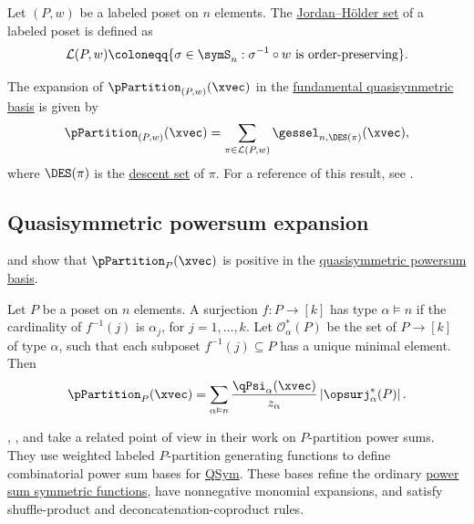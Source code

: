 Let $(P,w)$ be a labeled poset on $n$ elements. 
The \hyperref[jordanHolderSet]{Jordan--Hölder set} of a labeled poset is
defined as
\begin{equation*}
\mathcal{L}(P,w) \coloneqq
\{\sigma\in\symS_n:\sigma^{-1}\circ w\text{ is order-preserving}\}.
\end{equation*}

The expansion of $\pPartition_{(P,w)}(\xvec)$ in the
\hyperref[gessel]{fundamental quasisymmetric basis} is given by
\[
\pPartition_{(P,w)}(\xvec)
= \sum_{\pi \in \mathcal{L}(P,w)} \gessel_{n,\DES(\pi)}(\xvec),
\]
where $\DES(\pi)$ is the \hyperref[descentSet]{descent set} of $\pi$.
For a reference of this result, see \cite[Eq. (7.95)]{StanleyEC2}.



\subsection[pPartitionPsiExp]{Quasisymmetric powersum expansion}


 and 
\cite{AlexanderssonSulzgruber2019}
show that $\pPartition_P(\xvec)$ is positive
in the \hyperref[qPsi]{quasisymmetric powersum basis}. 

\begin{theorem}

Let $P$ be a poset on $n$ elements.
A surjection $f:P \to [k]$ has type $\alpha \vDash n$
if the cardinality of $f^{-1}(j)$ is $\alpha_j$, for $j=1,\dotsc,k$.
Let $\mathcal{O}_{\alpha}^{\ast}(P)$ be the set of 
\label{orderPreservingSurjection}
$P \to [k]$
of type $\alpha$, such that each subposet $f^{-1}(j) \subseteq P$
has a unique minimal element.
Then
\[
\pPartition_P(\xvec)
=
\sum_{\alpha\vDash n}
\frac{\qPsi_{\alpha}(\xvec)}{z_{\alpha}}\left| \opsurj_{\alpha}^{\ast}(P) \right|.
\]
\end{theorem}

, , and
 \cite{AliniaeifardWangWilligenburg2023}
take a related point of view in their work on $P$-partition power sums.  They
use weighted labeled $P$-partition generating functions to define combinatorial
power sum bases for \hyperref[quasiSymmetricFunctions]{QSym}.  These bases
refine the ordinary \hyperref[powerSum]{power sum symmetric functions}, have
nonnegative monomial expansions, and satisfy shuffle-product and
deconcatenation-coproduct rules.

